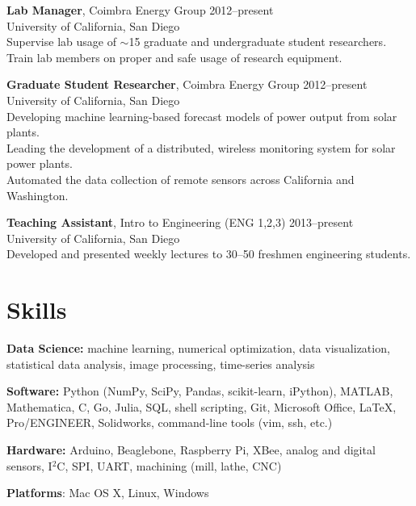 \documentclass[]{res}
\begin{document}
\begin{resume}
\textbf{Lab Manager}, Coimbra Energy Group \hfill 2012--present \\
University of California, San Diego \\
Supervise lab usage of $\sim$15 graduate and undergraduate student researchers. \\
Train lab members on proper and safe usage of research equipment.

\textbf{Graduate Student Researcher}, Coimbra Energy Group \hfill 2012--present \\
University of California, San Diego \\
Developing machine learning-based forecast models of power output from solar plants. \\
Leading the development of a distributed, wireless monitoring system for solar power plants. \\
Automated the data collection of remote sensors across California and Washington.

\textbf{Teaching Assistant}, Intro to Engineering (ENG 1,2,3) \hfill 2013--present \\
University of California, San Diego \\
Developed and presented weekly lectures to 30--50 freshmen engineering students.



\section{Skills}
\vspace{0.1in}

\textbf{Data Science:} machine learning, numerical optimization, data
visualization, statistical data analysis, image processing, time-series
analysis

\textbf{Software:} Python (NumPy, SciPy, Pandas, scikit-learn, iPython),
MATLAB, Mathematica, C, Go, Julia, SQL, shell scripting, Git, Microsoft Office,
LaTeX, Pro/ENGINEER, Solidworks, command-line tools (vim, ssh, etc.)

\textbf{Hardware:} Arduino, Beaglebone, Raspberry Pi, XBee, analog and digital
sensors, I$^2$C, SPI, UART, machining (mill, lathe, CNC)

\textbf{Platforms}: Mac OS X, Linux, Windows




\end{resume}
\end{document}
